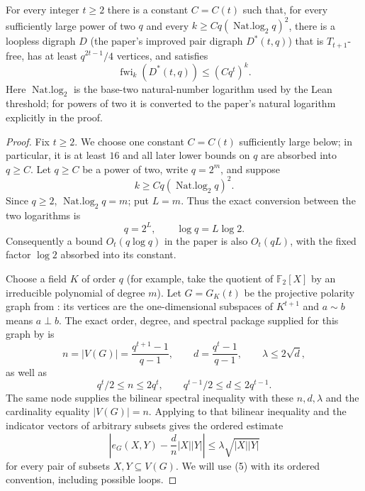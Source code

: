 \begin{lemma}
For every integer $t\geq2$ there is a constant $C=C(t)$ such that, for every
sufficiently large power of two $q$ and every $k\geq Cq(\operatorname{Nat.log}_2 q)^2$,
there is a loopless digraph $D$ (the paper's improved pair digraph
$D^*(t,q)$) that is $T_{t+1}$-free, has at least $q^{2t-1}/4$ vertices, and
satisfies
\[
 \operatorname{fwi}_k(D^*(t,q))\leq(Cq^t)^k.
\]
Here $\operatorname{Nat.log}_2$ is the base-two natural-number logarithm used
by the Lean threshold; for powers of two it is converted to the paper's
natural logarithm explicitly in the proof.
\end{lemma}
\begin{proof}
Fix $t\geq2$.  We choose one constant $C=C(t)$ sufficiently large below;
in particular, it is at least $16$ and all later lower bounds on $q$ are
absorbed into $q\geq C$.  Let $q\geq C$ be a power of two, write
$q=2^m$, and suppose
\[
        k\geq Cq(\operatorname{Nat.log}_2 q)^2.                 \tag{1}
\]
Since $q\geq2$, $\operatorname{Nat.log}_2 q=m$; put $L=m$.  Thus the exact
conversion between the two logarithms is
\[
        q=2^L,\qquad \log q=L\log2.
                                                               \tag{2}
\]
Consequently a bound $O_t(q\log q)$ in the paper is also $O_t(qL)$, with
the fixed factor $\log2$ absorbed into its constant.

Choose a field $K$ of order $q$ (for example, take the quotient of
$\mathbb F_2[X]$ by an irreducible polynomial of degree $m$).  Let
$G=G_K(t)$ be the projective polarity graph from
: its vertices are the one-dimensional subspaces of
$K^{t+1}$ and $a\sim b$ means $a\perp b$.  The exact order, degree, and
spectral package supplied for this graph by
 is
\[
 n=|V(G)|=\frac{q^{t+1}-1}{q-1},\qquad
 d=\frac{q^t-1}{q-1},\qquad
 \lambda\leq2\sqrt d,
                                                               \tag{3}
\]
as well as
\[
 q^t/2\leq n\leq2q^t,\qquad
 q^{t-1}/2\leq d\leq2q^{t-1}.                                 \tag{4}
\]
The same node supplies the bilinear spectral inequality with these $n,d,
\lambda$ and the cardinality equality $|V(G)|=n$.  Applying
 to that bilinear inequality and the indicator
vectors of arbitrary subsets gives the ordered estimate
\[
 \left|e_G(X,Y)-\frac dn|X||Y|\right|
 \leq\lambda\sqrt{|X||Y|}                                    \tag{5}
\]
for every pair of subsets $X,Y\subseteq V(G)$.  We will use (5) with its
ordered convention, including possible loops.


\end{proof}
